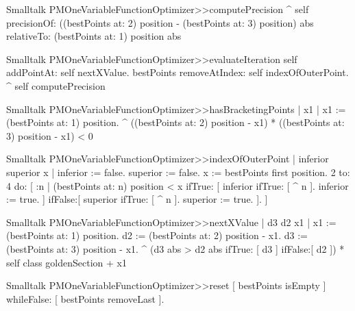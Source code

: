 \begin{displaycode}{Smalltalk}
PMOneVariableFunctionOptimizer>>computePrecision
    ^ self precisionOf: ((bestPoints at: 2) position - (bestPoints 
                                                  at: 3) position) abs
           relativeTo: (bestPoints at: 1) position abs
\end{displaycode}

\begin{displaycode}{Smalltalk}
PMOneVariableFunctionOptimizer>>evaluateIteration
    self addPointAt: self nextXValue.
    bestPoints removeAtIndex: self indexOfOuterPoint.
    ^ self computePrecision
\end{displaycode}

\begin{displaycode}{Smalltalk}
PMOneVariableFunctionOptimizer>>hasBracketingPoints
    | x1 |
    x1 := (bestPoints at: 1) position.
    ^ ((bestPoints at: 2) position - x1) * ((bestPoints at: 3) 
                                                    position - x1) < 0
\end{displaycode}
                                                  
\begin{displaycode}{Smalltalk}
PMOneVariableFunctionOptimizer>>indexOfOuterPoint
    | inferior superior x |
    inferior := false.
    superior := false.
    x := bestPoints first position.
    2 to: 4 do:
        [ :n |
          (bestPoints at: n) position < x
                ifTrue: [ inferior
                            ifTrue: [ ^ n ].
                          inferior := true.
                        ]
                ifFalse:[ superior
                            ifTrue: [ ^ n ].
                          superior := true.
                        ].
        ]
\end{displaycode}

\begin{displaycode}{Smalltalk}
PMOneVariableFunctionOptimizer>>nextXValue
    | d3 d2 x1 |
    x1 := (bestPoints at: 1) position.
    d2 := (bestPoints at: 2) position - x1.
    d3 := (bestPoints at: 3) position - x1.
    ^ (d3 abs > d2 abs ifTrue: [ d3 ]
                       ifFalse:[ d2 ]) * self class goldenSection + x1
\end{displaycode}

\begin{displaycode}{Smalltalk}
PMOneVariableFunctionOptimizer>>reset
    [ bestPoints isEmpty ] whileFalse: [ bestPoints removeLast ].
\end{displaycode}

